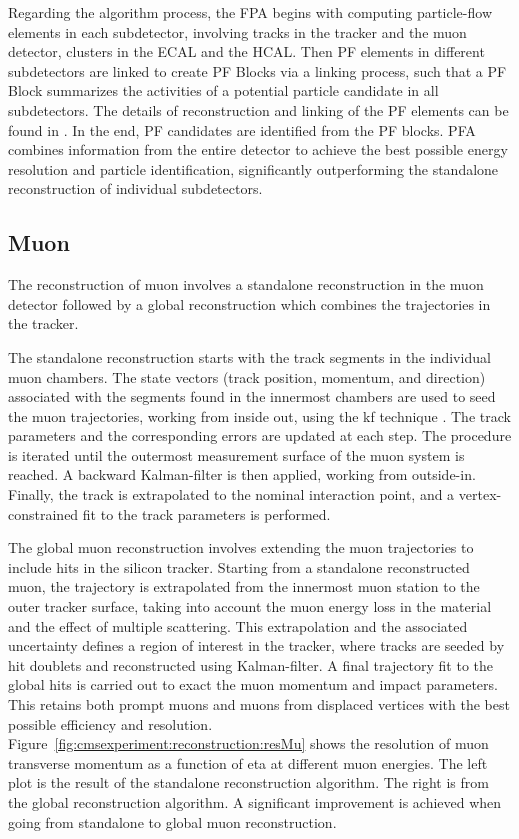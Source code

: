 Regarding the algorithm process, the FPA begins with computing particle-flow elements in each subdetector, involving tracks in the tracker and the muon detector, clusters in the ECAL and the HCAL. Then PF elements in different subdetectors are linked to create PF Blocks via a linking process, such that a PF Block summarizes the activities of a potential particle candidate in all subdetectors. The details of reconstruction and linking of the PF elements can be found in \cite{cms:particleflow:Sirunyan:2017ulk}. In the end, PF candidates are identified from the PF blocks. PFA combines information from the entire detector to achieve the best possible energy resolution and particle identification, significantly outperforming the standalone reconstruction of individual subdetectors.




\subsection{Muon}

The reconstruction of muon involves a standalone reconstruction in the muon detector followed by a global reconstruction which combines the trajectories in the tracker. 

The standalone reconstruction starts with the track segments in the individual muon chambers. The state vectors (track position, momentum, and direction) associated with the segments found in the innermost chambers are used to seed the muon trajectories, working from inside out, using the \acrfull{kf} technique \cite{tech:kf:Fruhwirth:1987fm}. The track parameters and the corresponding errors are updated at each step. The procedure is iterated until the outermost measurement surface of the muon system is reached. A backward Kalman-filter is then applied, working from outside-in. Finally, the track is extrapolated to the nominal interaction point, and a vertex-constrained fit to the track parameters is performed.

The global muon reconstruction involves extending the muon trajectories to include hits in the silicon tracker. Starting from a standalone reconstructed muon, the trajectory is extrapolated from the innermost muon station to the outer tracker surface, taking into account the muon energy loss in the material and the effect of multiple scattering. This extrapolation and the associated uncertainty defines a region of interest in the tracker, where tracks are seeded by hit doublets and reconstructed using Kalman-filter. A final trajectory fit to the global hits is carried out to exact the muon momentum and impact parameters. This retains both prompt muons and muons from displaced vertices with the best possible efficiency and resolution. Figure~\ref{fig:cmsexperiment:reconstruction:resMu} shows the resolution of muon transverse momentum as a function of eta at different muon energies. The left plot is the result of the standalone reconstruction algorithm. The right is from the global reconstruction algorithm. A significant improvement is achieved when going from standalone to global muon reconstruction.

